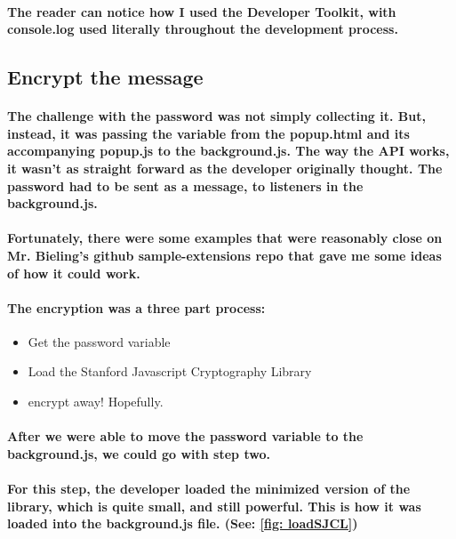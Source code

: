 \paragraph{The reader can notice how I used the Developer Toolkit, with console.log used literally throughout the development process.}

\subsection{Encrypt the message}
\paragraph{The challenge with the password was not simply collecting it. But, instead, it was passing the variable from the popup.html and its accompanying popup.js to the background.js. The way the API works, it wasn't as straight forward as the developer originally thought. The password had to be sent as a message, to listeners in the background.js.}

\paragraph{Fortunately, there were some examples that were reasonably close on Mr. Bieling's github sample-extensions repo that gave me some ideas of how it could work.}

\paragraph{The encryption was a three part process:} 

\begin{itemize}
\item Get the password variable
\item Load the Stanford Javascript Cryptography Library
\item encrypt away! Hopefully. 
\end{itemize}

\paragraph{After we were able to move the password variable to the background.js, we could go with step two.}

\paragraph{For this step, the developer loaded the minimized version of the library, which is quite small, and still powerful. This is how it was loaded into the background.js file. (See: \ref{fig: loadSJCL})}



